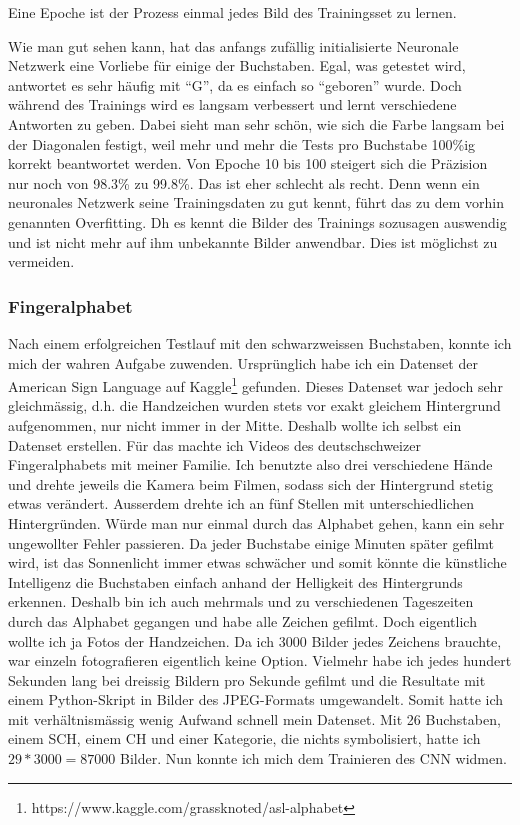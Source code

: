 \documentclass[11pt,a4paper,ngerman]{article}
\begin{document}
\bigskip
Eine Epoche ist der Prozess einmal jedes Bild des Trainingsset zu lernen.

\bigskip
Wie man gut sehen kann, hat das anfangs zufällig initialisierte Neuronale Netzwerk eine Vorliebe für einige der Buchstaben. Egal, was getestet wird, antwortet es sehr häufig mit \enquote{G}, da es einfach so \enquote{geboren} wurde. Doch während des Trainings wird es langsam verbessert und lernt verschiedene Antworten zu geben. Dabei sieht man sehr schön, wie sich die Farbe langsam bei der Diagonalen festigt, weil mehr und mehr die Tests pro Buchstabe 100\%ig korrekt beantwortet werden. Von Epoche 10 bis 100 steigert sich die Präzision nur noch von 98.3\% zu 99.8\%. Das ist eher schlecht als recht. Denn wenn ein neuronales Netzwerk seine Trainingsdaten zu gut kennt, führt das zu dem vorhin genannten Overfitting. Dh es kennt die Bilder des Trainings sozusagen auswendig und ist nicht mehr auf ihm unbekannte Bilder anwendbar. Dies ist möglichst zu vermeiden.

\subsubsection{Fingeralphabet}

Nach einem erfolgreichen Testlauf mit den schwarzweissen Buchstaben, konnte ich mich der wahren Aufgabe zuwenden. Ursprünglich habe ich ein Datenset der American Sign Language auf Kaggle\footnote{https://www.kaggle.com/grassknoted/asl-alphabet} gefunden. Dieses Datenset war jedoch sehr gleichmässig, d.h. die Handzeichen wurden stets vor exakt gleichem Hintergrund aufgenommen, nur nicht immer in der Mitte. Deshalb wollte ich selbst ein Datenset erstellen. Für das machte ich Videos des deutschschweizer Fingeralphabets mit meiner Familie. Ich benutzte also drei verschiedene Hände und drehte jeweils die Kamera beim Filmen, sodass sich der Hintergrund stetig etwas verändert. Ausserdem drehte ich an fünf Stellen mit unterschiedlichen Hintergründen. Würde man nur einmal durch das Alphabet gehen, kann ein sehr ungewollter Fehler passieren. Da jeder Buchstabe einige Minuten später gefilmt wird, ist das Sonnenlicht immer etwas schwächer und somit könnte die künstliche Intelligenz die Buchstaben einfach anhand der Helligkeit des Hintergrunds erkennen. Deshalb bin ich auch mehrmals und zu verschiedenen Tageszeiten durch das Alphabet gegangen und habe alle Zeichen gefilmt. Doch eigentlich wollte ich ja Fotos der Handzeichen. Da ich 3000 Bilder jedes Zeichens brauchte, war einzeln fotografieren eigentlich keine Option. Vielmehr habe ich jedes hundert Sekunden lang bei dreissig Bildern pro Sekunde gefilmt und die Resultate mit einem Python-Skript in Bilder des JPEG-Formats umgewandelt. Somit hatte ich mit verhältnismässig wenig Aufwand schnell mein Datenset. Mit 26 Buchstaben, einem SCH, einem CH und einer Kategorie, die nichts symbolisiert, hatte ich $ 29*3000 = 87000 $ Bilder. Nun konnte ich mich dem Trainieren des CNN widmen.
\end{document}
